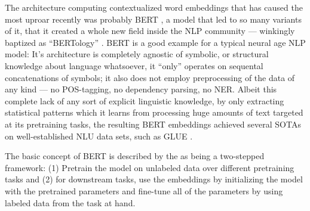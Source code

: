 The architecture computing contextualized word embeddings that has caused the most uproar
recently was probably BERT \cite{devlin2018bert}, a model that led to so many variants of
it, that it created a whole new field inside the NLP community --- winkingly baptized as
``BERTology'' \cite{rogers2020primer}. BERT is a good example for a typical neural age NLP
model: It's architecture is completely agnostic of symbolic, or structural knowledge about
language whatsoever, it ``only'' operates on sequental concatenations of symbols; it also
does not employ preprocessing of the data of any kind --- no POS-tagging, no dependency
parsing, no NER. Albeit this complete lack of any sort of explicit linguistic knowledge,
by only extracting statistical patterns which it learns from processing huge amounts of
text targeted at its pretraining tasks, the resulting BERT embeddings achieved several
SOTAs on well-established NLU data sets, such as GLUE \cite{wang2018glue}.


The basic concept of BERT is described by the \citeauthor{devlin2018bert} as
being a two-stepped framework: (1) Pretrain the model on unlabeled data over
different pretraining tasks and (2) for downstream tasks, use the embeddings by initializing
the model with the pretrained parameters and fine-tune all of the parameters
by using labeled data from the task at hand.

